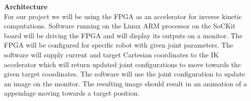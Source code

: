 \textbf{Architecture}\\
For our project we will be using the FPGA as an accelerator for
inverse kinetic computations. Software running on the Linux ARM processor 
on the SoCKit board will be driving the FPGA and will display its outputs on 
a monitor. The FPGA will be configured for specific robot with given joint 
parameters. The software will supply current and target Cartesian coordinates 
to the IK accelerator which will return updated joint configurations to 
move towards the given target coordinates. The software will use the 
joint configuration to update an image on the monitor. The resulting 
image should result in an animation of a appendage moving towards a target 
position.
